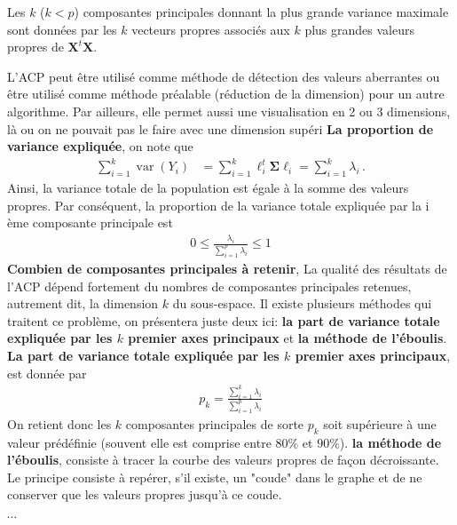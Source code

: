 \begin{theorem}
Les $k$ ($k<p$) composantes principales donnant la plus grande variance maximale sont données par les $k$ vecteurs propres associés aux $k$ plus grandes valeurs propres de $\mathbf{X}^t \mathbf{X}$.
\end{theorem}
L'ACP peut être utilisé comme méthode de détection des valeurs aberrantes ou être utilisé comme méthode préalable (réduction de la dimension)  pour un autre  algorithme.  Par ailleurs, elle permet aussi une visualisation en 2 ou 3 dimensions, là ou on ne pouvait pas le faire avec une dimension supéri\newl
\textbf{La proportion de variance expliquée}, on note que 
\begin{align*}
\sum_{i=1}^{k}\operatorname{var}\left(Y_{i}\right) &=\sum_{i=1}^{k}\ell_{i}^{t} \boldsymbol{\Sigma} \ell_{i}=\sum_{i=1}^{k}\lambda_i \,.
\end{align*}
Ainsi, la variance totale de la population est égale à la somme des valeurs propres. Par conséquent, la proportion de la variance totale expliquée par la i ème composante principale est 
\begin{align*}
0\leq \frac{\lambda_i}{\sum_{i=1}^{p}\lambda_i }\leq 1
\end{align*}
\textbf{Combien de composantes principales à retenir}, 
La qualité des résultats de l'ACP dépend fortement du nombres de composantes principales retenues, autrement dit, la dimension  $k$ du sous-espace. Il existe plusieurs méthodes qui traitent ce problème, on présentera juste deux ici: \textbf{la part de variance totale expliquée par les $k$ premier axes principaux} et \textbf{la méthode de l'éboulis}.\\
\textbf{La part de variance totale expliquée par les $k$ premier axes principaux}, est donnée par 
\begin{align*}
p_k=\frac{\sum_{i=1}^{k} \lambda_i}{\sum_{i=1}^{p}\lambda_i }
\end{align*}
On retient donc les $k$ composantes principales de sorte $p_k$  soit supérieure à une valeur prédéfinie (souvent elle est  comprise entre $80\%$ et $90\%$). \newl
\textbf{la méthode de l'éboulis}, consiste à tracer la courbe des valeurs propres de façon décroissante. Le principe consiste à repérer, s'il existe, un "coude" dans le graphe et de ne conserver que les valeurs propres jusqu'à ce coude.
\begin{example}
$\cdots$
\end{example}

